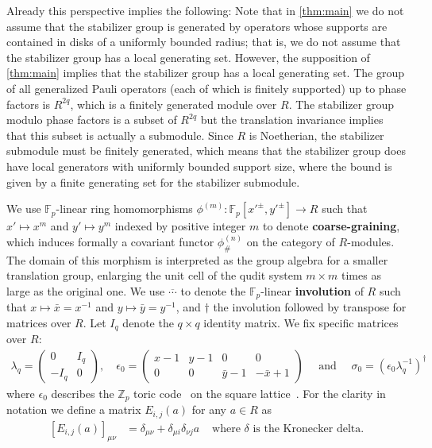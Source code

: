 \documentclass[aps,pra,
floatfix,notitlepage,
nofootinbib,
longbibliography,11pt]{revtex4-1}
\theoremstyle{definition}
\newcommand{\ZZ}{{\mathbb{Z}}}
\newcommand{\FF}{{\mathbb{F}}}
\newcommand{\cg}[1]{{\phi_\#^{({#1})}}}
\begin{document}
Already this perspective implies the following:
Note that in \cref{thm:main} we do not assume that the stabilizer group is generated
by operators whose supports are contained in disks of a uniformly bounded radius;
that is, we do not assume that the stabilizer group has a local generating set.
However, the supposition of \cref{thm:main} implies
that the stabilizer group has a local generating set.
The group of all generalized Pauli operators (each of which is finitely supported)
up to phase factors is $R^{2q}$, which is a finitely generated module over $R$.
The stabilizer group modulo phase factors is a subset of $R^{2q}$
but the translation invariance implies that this subset is actually a submodule.
Since $R$ is Noetherian, the stabilizer submodule must be finitely generated,
which means that the stabilizer group does have local generators
with uniformly bounded support size,
where the bound is given by a finite generating set for the stabilizer submodule.


We use $\FF_p$-linear ring homomorphisms $\phi^{(m)} : \FF_p[x'^\pm, y'^\pm] \to R$ 
such that $x' \mapsto x^m$ and $y' \mapsto y^m$
indexed by positive integer $m$
to denote {\bf coarse-graining},
which induces formally a covariant functor $\cg{n}$ on the category of $R$-modules.
The domain of this morphism is interpreted as the group algebra for a smaller translation group,
enlarging the unit cell of the qudit system $m \times m$ times as large as the original one.
We use $\overline \cdots$ to denote the $\FF_p$-linear {\bf involution} of $R$ 
such that $x \mapsto \bar x = x^{-1}$ and $y \mapsto \bar y = y^{-1}$,
and $\dagger$ the involution followed by transpose for matrices over $R$.
Let $I_q$ denote the $q \times q$ identity matrix.
We fix specific matrices over $R$:
\begin{align}
\lambda_q = \begin{pmatrix} 0 & I_q \\ - I_q & 0 \end{pmatrix}, \quad
\epsilon_0 = \begin{pmatrix}
x-1 & y-1 & 0 & 0 \\
0   & 0   & \bar y -1 & -\bar x + 1
\end{pmatrix} \quad \text{ and }\quad
\sigma_0 = (\epsilon_0 \lambda_q^{-1})^\dagger
 \label{eq:eps0}
\end{align}
where $\epsilon_0$ describes the $\ZZ_p$ toric code~\cite{Kitaev_2003} 
on the square lattice~\cite[\S5 Ex.~2]{Haah2013}.
For the clarity in notation we define a matrix $E_{i,j}(a)$ for any $a \in R$ as
\begin{align}
 \left[ E_{i,j}(a) \right]_{\mu \nu} &= \delta_{\mu \nu} + \delta_{\mu i} \delta_{\nu j} a 
 & \text{ where $\delta$ is the Kronecker delta}.
\end{align}
\end{document}
